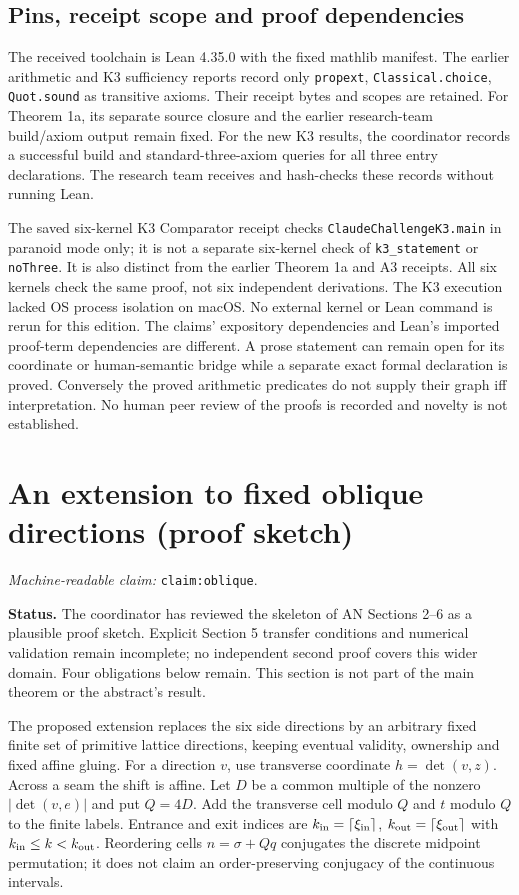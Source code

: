 \documentclass[11pt]{amsart}
\newcommand{\record}[1]{\nolinkurl{#1}}
\newcommand{\claimid}[1]{\par\nopagebreak\noindent\textit{Machine-readable claim:} \record{#1}.\par}
\theoremstyle{definition}\newtheorem{definition}{Definition}
\begin{document}
\subsection{Pins, receipt scope and proof dependencies}\label{sec:formal-records}
The received toolchain is Lean 4.35.0 with the fixed mathlib manifest.
The earlier arithmetic and K3 sufficiency reports record only
\record{propext}, \record{Classical.choice}, \record{Quot.sound} as
transitive axioms. Their receipt bytes and scopes are retained.
For Theorem 1a, its separate source closure and the earlier research-team
build/axiom output remain fixed. For the new K3 results, the coordinator
records a successful build and standard-three-axiom queries for all three
entry declarations. The research team receives and hash-checks these
records without running Lean.

The saved six-kernel K3 Comparator receipt checks
\record{ClaudeChallengeK3.main} in paranoid mode only; it is not a separate
six-kernel check of \record{k3_statement} or \record{noThree}.
It is also distinct from the earlier Theorem 1a and A3 receipts.
All six kernels check the same proof, not six independent derivations.
The K3 execution lacked OS process isolation on macOS. No external kernel
or Lean command is rerun for this edition.
The claims' expository dependencies and Lean's imported proof-term
dependencies are different. A prose statement can remain open for
its coordinate or human-semantic bridge while a separate exact
formal declaration is proved. Conversely the proved arithmetic
predicates do not supply their graph iff interpretation. No human
peer review of the proofs is recorded and novelty is not established.

\section{An extension to fixed oblique directions (proof sketch)}\label{sec:extension}
\label{claim:oblique}\claimid{claim:oblique}
\textbf{Status.} The coordinator has reviewed the skeleton of AN
Sections 2--6 as a plausible proof sketch. Explicit Section 5 transfer
conditions and numerical validation remain incomplete; no independent
second proof covers this wider domain. Four obligations below remain.
This section is not part of the main theorem or the abstract's result.

The proposed extension replaces the six side directions by an arbitrary
fixed finite set of primitive lattice directions, keeping eventual
validity, ownership and fixed affine gluing. For a direction $v$, use
transverse coordinate $h=\det(v,z)$. Across a seam the shift is affine.
Let $D$ be a common multiple of the nonzero $|\det(v,e)|$ and put
$Q=4D$. Add the transverse cell modulo $Q$ and $t$ modulo $Q$ to the
finite labels. Entrance and exit indices are
$k_{\rm in}=\lceil\xi_{\rm in}\rceil$,
$k_{\rm out}=\lceil\xi_{\rm out}\rceil$ with
$k_{\rm in}\le k<k_{\rm out}$. Reordering cells $n=\sigma+Qq$
conjugates the discrete midpoint permutation; it does not claim an
order-preserving conjugacy of the continuous intervals.
\end{document}
